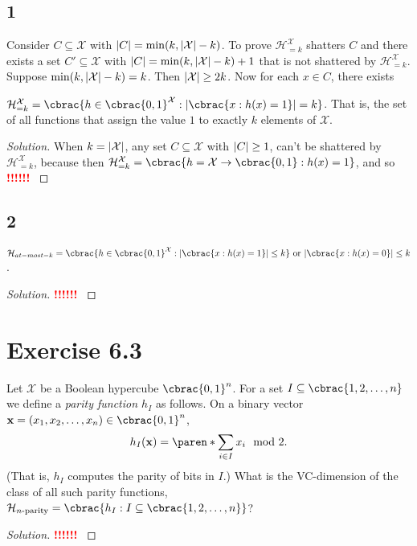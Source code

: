 \documentclass[10pt, a4paper, twoside]{amsart}
\DeclarePairedDelimiter\abs{\lvert}{\rvert}
\DeclarePairedDelimiter\cbrac\{\}
\DeclarePairedDelimiter\paren()
\newcommand{\cH}{\ensuremath{\mathcal{H}}}
\newcommand{\cX}{\ensuremath{\mathcal{X}}}
\newenvironment{solution}
               {\let\oldqedsymbol=\qedsymbol
                \renewcommand{\qedsymbol}{$\blacktriangleleft$}
                \begin{proof}[Solution]}
               {\end{proof}
                \renewcommand{\qedsymbol}{\oldqedsymbol}}
\newcommand{\TODO}{\textcolor{red}{\textbf{!!!!!! }}}
\begin{document}
\subsection*{1}
Consider $C \subseteq \cX$ with $\abs{C} = \min(k,\abs{\cX}-k)$. To prove $\cH^{\cX}_{=k}$ shatters $C$ and there exists a set  $C' \subseteq \cX$ with $\abs{C} = \min(k,\abs{\cX}-k)+1$ that is not shattered by $\cH^{\cX}_{=k}$.\\
Suppose $\min(k,\abs{\cX}-k) = k$. Then $\abs{\cX} \geq 2k$.  Now for each $x \in C$, there exists 

$\cH^{\cX}_{=k} = \cbrac{h \in \cbrac{0,1}^{\cX}: \abs{\cbrac{x: h(x) = 1}}=k}$. That is, the set of all functions that assign the value $1$ to exactly $k$ elements of $\cX$.
\begin{solution}
  When $k = \abs{\cX}$, any set $C \subseteq \cX$ with $\abs{C} \geq 1$, can't be shattered by $\cH^{\cX}_{=k}$, because then $\cH^{\cX}_{=k}= \cbrac{h =\cX \to \cbrac{0,1}: h(x) = 1 }$, and so 
\TODO
\end{solution}
\subsection*{2}
$\cH_{at-most-k} = \cbrac{h \in \cbrac{0,1}^{\cX}: \abs{\cbrac{x: h(x) = 1}} \leq k} \text{ or }  \abs{\cbrac{x: h(x) = 0}}\leq k$.
\begin{solution}
\TODO
\end{solution}
\section*{Exercise 6.3}
Let $\cX$ be a Boolean hypercube $\cbrac{0,1}^n$. For a set $I \subseteq \cbrac{1,2,\ldots ,n}$ we define a \textit{parity function $h_I$} as follows. On a binary vector $\mathbf{x} = (x_1,x_2,\ldots ,x_n) \in \cbrac{0,1}^n$,
\begin{equation*}
  h_I(\mathbf{x}) = \paren*{\sum_{i \in I}x_i} \mod 2.
\end{equation*}
(That is, $h_I$ computes the parity of bits in $I$.) What is the VC-dimension of the class of all such parity functions, $\cH_{n\text{-parity}} = \cbrac{h_I:I \subseteq \cbrac{1,2, \dots ,n}}$?
\begin{solution}
\TODO
\end{solution}
\end{document}
